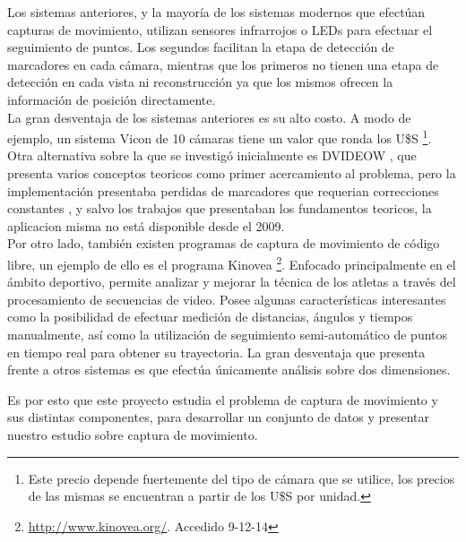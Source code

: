 Los sistemas anteriores, y la mayoría de los sistemas modernos que efectúan capturas de movimiento, utilizan sensores infrarrojos o LEDs para efectuar el seguimiento de puntos. Los segundos facilitan la etapa de detección de marcadores en cada cámara, mientras que los primeros no tienen una etapa de detección en cada vista ni reconstrucción ya que los mismos ofrecen la información de posición directamente.
\\ 

La gran desventaja de los sistemas anteriores es su alto costo. A modo de ejemplo, un sistema Vicon de 10 cámaras tiene un valor que ronda los U\$S \footnote{Este precio depende fuertemente del tipo de cámara que se utilice, los precios de las mismas se encuentran a partir de los U\$S por unidad.}.
\\ 

Otra alternativa sobre la que se investigó inicialmente es DVIDEOW \cite{figueroa2003flexible}, que presenta varios conceptos teoricos como primer acercamiento al problema, pero la implementación presentaba perdidas de marcadores que requerian correcciones constantes , y salvo los trabajos que presentaban los fundamentos teoricos, la aplicacion misma no está disponible desde el 2009.
\\ 

Por otro lado, también existen programas de captura de movimiento de código libre, un ejemplo de ello es el programa Kinovea
\footnote{ \textcolor{blue}{\underline{\url{http://www.kinovea.org/}}}. Accedido 9-12-14}. Enfocado principalmente en el ámbito deportivo, permite analizar y mejorar la técnica de los atletas a través del procesamiento de secuencias de video. Posee algunas características interesantes como la posibilidad de efectuar medición de distancias, ángulos y tiempos manualmente, así como la utilización de seguimiento semi-automático de puntos en tiempo real para obtener su trayectoria. La gran desventaja que presenta frente a otros sistemas es que efectúa únicamente análisis sobre dos dimensiones.

Es por esto que este proyecto estudia el problema de captura de movimiento y sus distintas componentes, para desarrollar un conjunto de datos y presentar nuestro estudio sobre captura de movimiento.  

